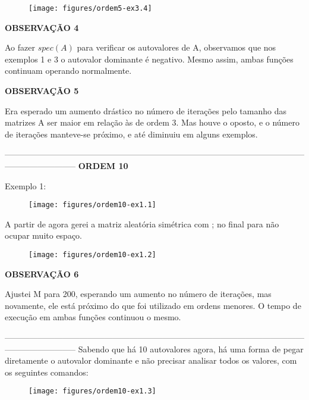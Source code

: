 \documentclass[leqno]{article}
\numberwithin{equation}{section}
\begin{document}
\begin{enumerate}
		\begin{figure}[H]
			\centering
			\texttt{[image: figures/ordem5-ex3.4]}
		\end{figure}
	
		\textbf{{\normalsize OBSERVAÇÃO 4}}
		
		Ao fazer $spec(A)$ para verificar os autovalores de A, observamos que nos exemplos 1 e 3 o autovalor dominante é negativo. Mesmo assim, ambas funções continuam operando normalmente.
		
		\textbf{{\normalsize OBSERVAÇÃO 5}}
		
		Era esperado um aumento drástico no número de iterações pelo tamanho das matrizes A ser maior em relação às de ordem 3. Mas houve o oposto, e o número de iterações manteve-se próximo, e até diminuiu em alguns exemplos.
		
		--------------------------------------------------------------------------------------------------------------------------------------
		\textbf{{\large ORDEM 10}}
		
		Exemplo 1:
		
		\begin{figure}[H]
			\centering
			\texttt{[image: figures/ordem10-ex1.1]}
		\end{figure}
	
		A partir de agora gerei a matriz aleatória simétrica com ; no final para não ocupar muito espaço.
		
		\begin{figure}[H]
			\centering
			\texttt{[image: figures/ordem10-ex1.2]}
		\end{figure}
	
		\textbf{{\normalsize OBSERVAÇÃO 6}}
		
		Ajustei M para 200, esperando um aumento no número de iterações, mas novamente, ele está próximo do que foi utilizado em ordens menores. O tempo de execução em ambas funções continuou o mesmo.
		
		--------------------------------------------------------------------------------------------------------------------------------------		
		Sabendo que há 10 autovalores agora, há uma forma de pegar diretamente o autovalor dominante e não precisar analisar todos os valores, com os seguintes comandos:
		
		\begin{figure}[H]
			\centering
			\texttt{[image: figures/ordem10-ex1.3]}
		\end{figure}
	

\end{enumerate}
\end{document}
